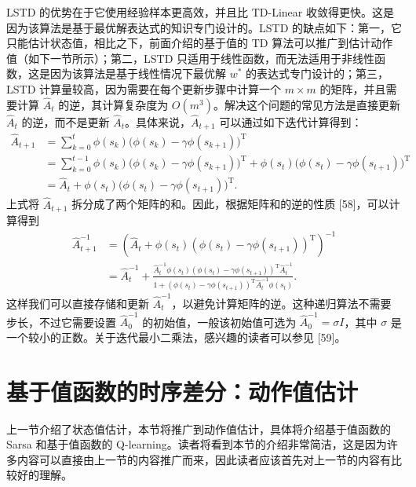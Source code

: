 LSTD 的优势在于它使用经验样本更高效，并且比 TD-Linear 收敛得更快。这是因为该算法是基于最优解表达式的知识专门设计的。LSTD 的缺点如下：第一，它只能估计状态值，相比之下，前面介绍的基于值的 TD 算法可以推广到估计动作值（如下一节所示）；第二，LSTD 只适用于线性函数，而无法适用于非线性函数，这是因为该算法是基于线性情况下最优解 $w^{*}$ 的表达式专门设计的；第三，LSTD 计算量较高，因为需要在每个更新步骤中计算一个 $m \times m$ 的矩阵，并且需要计算 $\hat{A}_{t}$ 的逆，其计算复杂度为 $O(m^{3})$。解决这个问题的常见方法是直接更新 $\hat{A}_{t}$ 的逆，而不是更新 $\hat{A}_{t}$。具体来说，$\hat{A}_{t+1}$ 可以通过如下迭代计算得到：
\begin{equation*}
\begin{aligned}
\hat{A}_{t+1} &= \sum_{k=0}^{t} \phi(s_{k}) \big(\phi(s_{k}) - \gamma \phi(s_{k+1})\big)^{\mathrm{T}} \\
&= \sum_{k=0}^{t-1} \phi(s_{k}) \big(\phi(s_{k}) - \gamma \phi(s_{k+1})\big)^{\mathrm{T}} + \phi(s_{t}) \big(\phi(s_{t}) - \gamma \phi(s_{t+1})\big)^{\mathrm{T}} \\
&= \hat{A}_{t} + \phi(s_{t}) \big(\phi(s_{t}) - \gamma \phi(s_{t+1})\big)^{\mathrm{T}}.
\end{aligned}
\end{equation*}
上式将 $\hat{A}_{t+1}$ 拆分成了两个矩阵的和。因此，根据矩阵和的逆的性质 [58]，可以计算得到
\begin{equation*}
\begin{aligned}
\hat{A}_{t+1}^{-1} &= (\hat{A}_{t} + \phi(s_{t}) (\phi(s_{t}) - \gamma \phi(s_{t+1}))^{\mathrm{T}})^{-1} \\
&= \hat{A}_{t}^{-1} + \frac{\hat{A}_{t}^{-1} \phi(s_{t}) (\phi(s_{t}) - \gamma \phi(s_{t+1}))^{\mathrm{T}} \hat{A}_{t}^{-1}}{1 + (\phi(s_{t}) - \gamma \phi(s_{t+1}))^{\mathrm{T}} \hat{A}_{t}^{-1} \phi(s_{t})}.
\end{aligned}
\end{equation*}
这样我们可以直接存储和更新 $\hat{A}_t^{-1}$，以避免计算矩阵的逆。这种递归算法不需要步长，不过它需要设置 $\hat{A}_0^{-1}$ 的初始值，一般该初始值可选为 $\hat{A}_0^{-1} = \sigma I$，其中 $\sigma$ 是一个较小的正数。关于迭代最小二乘法，感兴趣的读者可以参见 [59]。

\section{基于值函数的时序差分：动作值估计}
\label{sec:rl-vfa-td-action}

上一节介绍了状态值估计，本节将推广到动作值估计，具体将介绍基于值函数的 Sarsa 和基于值函数的 Q-learning。读者将看到本节的介绍非常简洁，这是因为许多内容可以直接由上一节的内容推广而来，因此读者应该首先对上一节的内容有比较好的理解。

